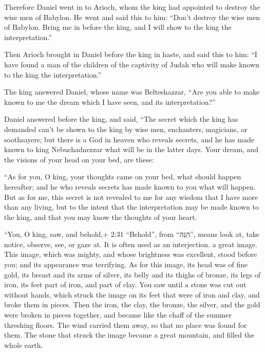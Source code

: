  Therefore Daniel went in to Arioch, whom the king had
appointed to destroy the wise men of Babylon. He went and said this to
him: ``Don't destroy the wise men of Babylon. Bring me in before the
king, and I will show to the king the interpretation.''

 Then Arioch brought in Daniel before the king in haste,
and said this to him: ``I have found a man of the children of the
captivity of Judah who will make known to the king the interpretation.''

 The king answered Daniel, whose name was Belteshazzar,
``Are you able to make known to me the dream which I have seen, and its
interpretation?''

 Daniel answered before the king, and said, ``The secret
which the king has demanded can't be shown to the king by wise men,
enchanters, magicians, or soothsayers;  but there is a God
in heaven who reveals secrets, and he has made known to king
Nebuchadnezzar what will be in the latter days. Your dream, and the
visions of your head on your bed, are these:

 ``As for you, O king, your thoughts came on your bed, what
should happen hereafter; and he who reveals secrets has made known to
you what will happen.  But as for me, this secret is not
revealed to me for any wisdom that I have more than any living, but to
the intent that the interpretation may be made known to the king, and
that you may know the thoughts of your heart.

 ``You, O king, saw, and behold,+ 2:31 ``Behold'', from
``הִנֵּה'', means look at, take notice, observe, see, or gaze at. It is
often used as an interjection. a great image. This image, which was
mighty, and whose brightness was excellent, stood before you; and its
appearance was terrifying.  As for this image, its head was
of fine gold, its breast and its arms of silver, its belly and its
thighs of bronze,  its legs of iron, its feet part of iron,
and part of clay.  You saw until a stone was cut out
without hands, which struck the image on its feet that were of iron and
clay, and broke them in pieces.  Then the iron, the clay,
the bronze, the silver, and the gold were broken in pieces together, and
became like the chaff of the summer threshing floors. The wind carried
them away, so that no place was found for them. The stone that struck
the image became a great mountain, and filled the whole earth.

